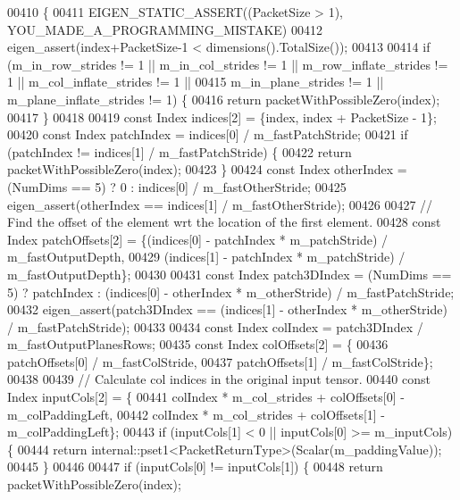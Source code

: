 \begin{DoxyCode}
00410 \textcolor{keyword}{  }\{
00411     EIGEN\_STATIC\_ASSERT((PacketSize > 1), YOU\_MADE\_A\_PROGRAMMING\_MISTAKE)
00412     eigen\_assert(index+PacketSize-1 < dimensions().TotalSize());
00413 
00414     \textcolor{keywordflow}{if} (m\_in\_row\_strides != 1 || m\_in\_col\_strides != 1 || m\_row\_inflate\_strides != 1 || 
      m\_col\_inflate\_strides != 1 ||
00415         m\_in\_plane\_strides != 1 || m\_plane\_inflate\_strides != 1) \{
00416       \textcolor{keywordflow}{return} packetWithPossibleZero(index);
00417     \}
00418 
00419     \textcolor{keyword}{const} Index indices[2] = \{index, index + PacketSize - 1\};
00420     \textcolor{keyword}{const} Index patchIndex = indices[0] / m\_fastPatchStride;
00421     \textcolor{keywordflow}{if} (patchIndex != indices[1] / m\_fastPatchStride) \{
00422       \textcolor{keywordflow}{return} packetWithPossibleZero(index);
00423     \}
00424     \textcolor{keyword}{const} Index otherIndex = (NumDims == 5) ? 0 : indices[0] / m\_fastOtherStride;
00425     eigen\_assert(otherIndex == indices[1] / m\_fastOtherStride);
00426 
00427     \textcolor{comment}{// Find the offset of the element wrt the location of the first element.}
00428     \textcolor{keyword}{const} Index patchOffsets[2] = \{(indices[0] - patchIndex * m\_patchStride) / m\_fastOutputDepth,
00429                                    (indices[1] - patchIndex * m\_patchStride) / m\_fastOutputDepth\};
00430 
00431     \textcolor{keyword}{const} Index patch3DIndex = (NumDims == 5) ? patchIndex : (indices[0] - otherIndex * m\_otherStride) / 
      m\_fastPatchStride;
00432     eigen\_assert(patch3DIndex == (indices[1] - otherIndex * m\_otherStride) / m\_fastPatchStride);
00433 
00434     \textcolor{keyword}{const} Index colIndex = patch3DIndex / m\_fastOutputPlanesRows;
00435     \textcolor{keyword}{const} Index colOffsets[2] = \{
00436       patchOffsets[0] / m\_fastColStride,
00437       patchOffsets[1] / m\_fastColStride\};
00438 
00439     \textcolor{comment}{// Calculate col indices in the original input tensor.}
00440     \textcolor{keyword}{const} Index inputCols[2] = \{
00441       colIndex * m\_col\_strides + colOffsets[0] - m\_colPaddingLeft,
00442       colIndex * m\_col\_strides + colOffsets[1] - m\_colPaddingLeft\};
00443     \textcolor{keywordflow}{if} (inputCols[1] < 0 || inputCols[0] >= m\_inputCols) \{
00444       \textcolor{keywordflow}{return} internal::pset1<PacketReturnType>(Scalar(m\_paddingValue));
00445     \}
00446 
00447     \textcolor{keywordflow}{if} (inputCols[0] != inputCols[1]) \{
00448       \textcolor{keywordflow}{return} packetWithPossibleZero(index);

\end{DoxyCode}
